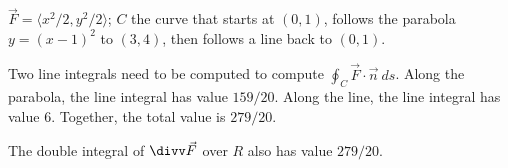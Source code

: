 {$\vec F = \langle x^2/2,y^2/2\rangle$; $C$ the curve that starts at $(0,1)$, follows the parabola $y=(x-1)^2$ to $(3,4)$, then follows a line back to $(0,1)$.
}
{Two line integrals need to be computed to compute $\oint_C \vec F\cdot \vec n\ ds$. 
Along the parabola, the line integral has value $159/20$. Along the line, the line integral has value $6$. Together, the total value is $279/20$.

The double integral of $\divv\vec F$ over $R$ also has value $279/20$.
}
